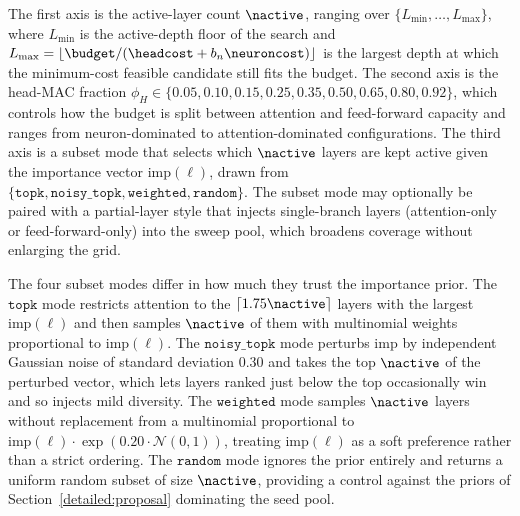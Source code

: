 The first axis is the active-layer count $\nactive$, ranging over $\{L_{\min}, \ldots, L_{\max}\}$, where $L_{\min}$ is the active-depth floor of the search and $L_{\max} = \lfloor \budget / (\headcost + b_n \neuroncost) \rfloor$ is the largest depth at which the minimum-cost feasible candidate still fits the budget. The second axis is the head-MAC fraction $\phi_H \in \{0.05, 0.10, 0.15, 0.25, 0.35, 0.50, 0.65, 0.80, 0.92\}$, which controls how the budget is split between attention and feed-forward capacity and ranges from neuron-dominated to attention-dominated configurations. The third axis is a subset mode that selects which $\nactive$ layers are kept active given the importance vector $\mathrm{imp}(\ell)$, drawn from $\{\mathtt{topk}, \mathtt{noisy\_topk}, \mathtt{weighted}, \mathtt{random}\}$. The subset mode may optionally be paired with a partial-layer style that injects single-branch layers (attention-only or feed-forward-only) into the sweep pool, which broadens coverage without enlarging the grid.

The four subset modes differ in how much they trust the importance prior. The $\mathtt{topk}$ mode restricts attention to the $\lceil 1.75 \nactive \rceil$ layers with the largest $\mathrm{imp}(\ell)$ and then samples $\nactive$ of them with multinomial weights proportional to $\mathrm{imp}(\ell)$. The $\mathtt{noisy\_topk}$ mode perturbs $\mathrm{imp}$ by independent Gaussian noise of standard deviation $0.30$ and takes the top $\nactive$ of the perturbed vector, which lets layers ranked just below the top occasionally win and so injects mild diversity. The $\mathtt{weighted}$ mode samples $\nactive$ layers without replacement from a multinomial proportional to $\mathrm{imp}(\ell) \cdot \exp(0.20 \cdot \mathcal{N}(0, 1))$, treating $\mathrm{imp}(\ell)$ as a soft preference rather than a strict ordering. The $\mathtt{random}$ mode ignores the prior entirely and returns a uniform random subset of size $\nactive$, providing a control against the priors of Section~\ref{detailed:proposal} dominating the seed pool.

